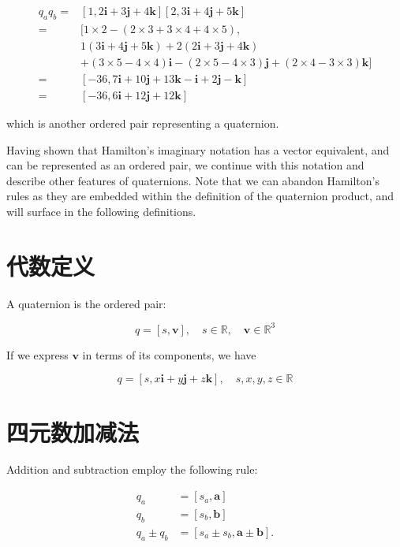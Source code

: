 $$
    \begin{aligned}
        q_{a} q_{b}= & {[1,2 \mathbf{i}+3 \mathbf{j}+4 \mathbf{k}][2,3 \mathbf{i}+4 \mathbf{j}+5 \mathbf{k}] }                    \\
        =            & {[1 \times 2-(2 \times 3+3 \times 4+4 \times 5),}                                                          \\
                     & 1(3 \mathbf{i}+4 \mathbf{j}+5 \mathbf{k})+2(2 \mathbf{i}+3 \mathbf{j}+4 \mathbf{k})                        \\
                     & +(3 \times 5-4 \times 4) \mathbf{i}-(2 \times 5-4 \times 3) \mathbf{j}+(2 \times 4-3 \times 3) \mathbf{k}] \\
        =            & {[-36,7 \mathbf{i}+10 \mathbf{j}+13 \mathbf{k}-\mathbf{i}+2 \mathbf{j}-\mathbf{k}] }                       \\
        =            & {[-36,6 \mathbf{i}+12 \mathbf{j}+12 \mathbf{k}] }
    \end{aligned}
$$

which is another ordered pair representing a quaternion.

Having shown that Hamilton's imaginary notation has a vector equivalent, and can be represented as an ordered pair, we continue with this notation and describe other features of quaternions. Note that we can abandon Hamilton's rules as they are embedded within the definition of the quaternion product, and will surface in the following definitions.

\section{代数定义}
A quaternion is the ordered pair:

$$
    q=[s, \mathbf{v}], \quad s \in \mathbb{R}, \quad \mathbf{v} \in \mathbb{R}^{3}
$$

If we express $\mathbf{v}$ in terms of its components, we have

$$
    q=[s, x \mathbf{i}+y \mathbf{j}+z \mathbf{k}], \quad s, x, y, z \in \mathbb{R}
$$

\section{四元数加减法}
Addition and subtraction employ the following rule:

$$
    \begin{aligned}
        q_{a}           & =\left[s_{a}, \mathbf{a}\right]                            \\
        q_{b}           & =\left[s_{b}, \mathbf{b}\right]                            \\
        q_{a} \pm q_{b} & =\left[s_{a} \pm s_{b}, \mathbf{a} \pm \mathbf{b}\right] .
    \end{aligned}
$$

